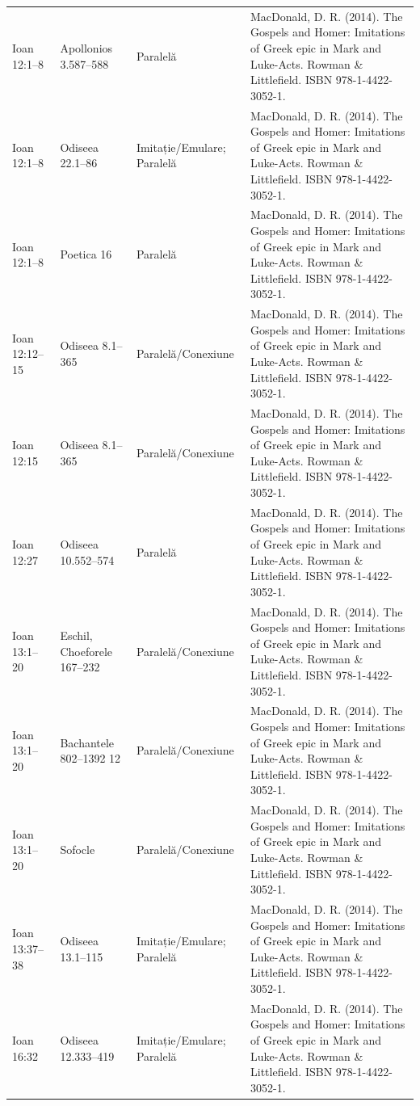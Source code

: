\documentclass[12pt,a4paper,twoside,openany]{book}
\begin{document}
\begin{longtable}{L{1.4cm}L{1.7cm}L{3.1cm}L{8.4cm}}
Ioan 12:1–8 & Apollonios 3.587–588 & Paralelă & MacDonald, D. R. (2014). The Gospels and Homer: Imitations of Greek epic in Mark and Luke-Acts. Rowman \& Littlefield. ISBN 978-1-4422-3052-1. \\
Ioan 12:1–8 & Odiseea 22.1–86 & Imitație/Emulare; Paralelă & MacDonald, D. R. (2014). The Gospels and Homer: Imitations of Greek epic in Mark and Luke-Acts. Rowman \& Littlefield. ISBN 978-1-4422-3052-1. \\
Ioan 12:1–8 & Poetica 16 & Paralelă & MacDonald, D. R. (2014). The Gospels and Homer: Imitations of Greek epic in Mark and Luke-Acts. Rowman \& Littlefield. ISBN 978-1-4422-3052-1. \\
Ioan 12:12–15 & Odiseea 8.1–365 & Paralelă/Conexiune & MacDonald, D. R. (2014). The Gospels and Homer: Imitations of Greek epic in Mark and Luke-Acts. Rowman \& Littlefield. ISBN 978-1-4422-3052-1. \\
Ioan 12:15 & Odiseea 8.1–365 & Paralelă/Conexiune & MacDonald, D. R. (2014). The Gospels and Homer: Imitations of Greek epic in Mark and Luke-Acts. Rowman \& Littlefield. ISBN 978-1-4422-3052-1. \\
Ioan 12:27 & Odiseea 10.552–574 & Paralelă & MacDonald, D. R. (2014). The Gospels and Homer: Imitations of Greek epic in Mark and Luke-Acts. Rowman \& Littlefield. ISBN 978-1-4422-3052-1. \\
Ioan 13:1–20 & Eschil, Choeforele 167–232 & Paralelă/Conexiune & MacDonald, D. R. (2014). The Gospels and Homer: Imitations of Greek epic in Mark and Luke-Acts. Rowman \& Littlefield. ISBN 978-1-4422-3052-1. \\
Ioan 13:1–20 & Bachantele 802–1392 12 & Paralelă/Conexiune & MacDonald, D. R. (2014). The Gospels and Homer: Imitations of Greek epic in Mark and Luke-Acts. Rowman \& Littlefield. ISBN 978-1-4422-3052-1. \\
Ioan 13:1–20 & Sofocle & Paralelă/Conexiune & MacDonald, D. R. (2014). The Gospels and Homer: Imitations of Greek epic in Mark and Luke-Acts. Rowman \& Littlefield. ISBN 978-1-4422-3052-1. \\
Ioan 13:37–38 & Odiseea 13.1–115 & Imitație/Emulare; Paralelă & MacDonald, D. R. (2014). The Gospels and Homer: Imitations of Greek epic in Mark and Luke-Acts. Rowman \& Littlefield. ISBN 978-1-4422-3052-1. \\
Ioan 16:32 & Odiseea 12.333–419 & Imitație/Emulare; Paralelă & MacDonald, D. R. (2014). The Gospels and Homer: Imitations of Greek epic in Mark and Luke-Acts. Rowman \& Littlefield. ISBN 978-1-4422-3052-1. \\

\end{longtable}
\end{document}
